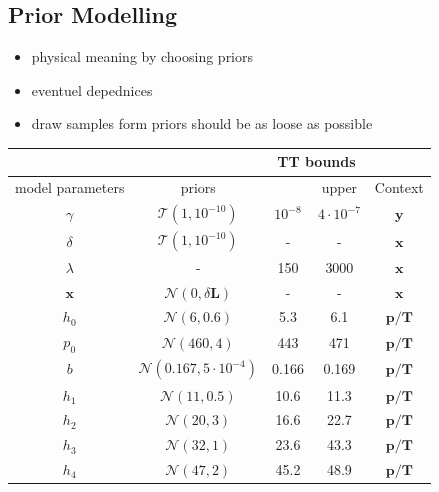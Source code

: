 \subsection{Prior Modelling}
\begin{itemize}
	\item physical meaning by choosing priors
	\item eventuel depednices
	\item draw samples form priors should be as loose as possible
\end{itemize}
\begin{table}
	\centering
	\begin{tabular}{ |c||c|c|c|c|   }
		\hline
		& &\multicolumn{2}{|c|}{TT bounds}&\\
		\hline
		model parameters& priors&\makecell{lower}& \makecell{upper\\
		}&Context\\
		\hhline{|=||=|=|=|=|}
		$\gamma$ & $\mathcal{T}(1,10^{-10})$ &$10^{-8}$ &$4 \cdot 10^{-7}$& $\bm{y}$\\ \hline
		$\delta$ &$\mathcal{T}(1,10^{-10})$ & -&-& $\bm{x}$\\ \hline
		$\lambda$ &- & 150&3000& $\bm{x}$\\ \hline
		$\bm{x}$ &$\mathcal{N}(0,\delta \bm{L})$ & -&-& $\bm{x}$\\ \hhline{|=||=|=|=|=|}
		$h_0$ &  $\mathcal{N}(6,0.6)$& 5.3&6.1&$\bm{p/T}$\\ \hline
		$p_0$ &  $\mathcal{N}(460,4)$&443 &471&$\bm{p/T}$\\ \hline
		$b$ &  $\mathcal{N}(0.167,5 \cdot 10^{-4})$& 0.166& 0.169 &$\bm{p/T}$\\ \hline
		$h_{1}$ &  $\mathcal{N}(11,0.5)$&10.6 &11.3&$\bm{p/T}$\\ \hline
		$h_{2}$ &  $\mathcal{N}(20,3)$&16.6 &22.7&$\bm{p/T}$\\ \hline
		$h_{3}$ &  $\mathcal{N}(32,1)$&23.6 &43.3&$\bm{p/T}$\\ \hline
		$h_{4}$ &  $\mathcal{N}(47,2)$&45.2 &48.9&$\bm{p/T}$\\ \hline

\end{tabular}
\end{table}
